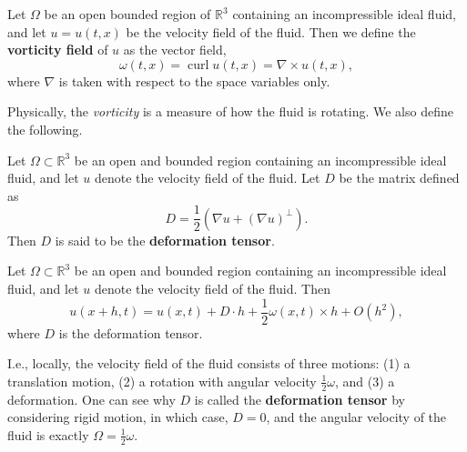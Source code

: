 \documentclass{article}
\begin{document}
\begin{definition}
	Let $\Omega$ be an open bounded region of $\mathbb{R}^{3}$ containing an incompressible ideal fluid, and let $u = u(t, x)$ be the velocity field of the fluid. Then we define the \textbf{vorticity field} of $u$ as the vector field, 
	\begin{equation}
		\omega(t,x) = \operatorname{curl}{u(t,x)} = \nabla \times u(t, x), 
	\end{equation}
	where $\nabla$ is taken with respect to the space variables only.
\end{definition} 
Physically, the \textit{vorticity} is a measure of how the fluid is rotating. We also define the following. 

\begin{definition}
	Let $\Omega \subset \mathbb{R}^{3}$ be an open and bounded region containing an incompressible ideal fluid, and let $u$ denote the velocity field of the fluid. Let $D$ be the matrix defined as 
	\begin{equation*}
		D = \frac{1}{2}(\nabla u + (\nabla u)^{\perp}). 
	\end{equation*}
	Then $D$ is said to be the \textbf{deformation tensor}. 
\end{definition} 
\begin{prop}
	Let $\Omega \subset \mathbb{R}^{3}$ be an open and bounded region containing an incompressible ideal fluid, and let $u$ denote the velocity field of the fluid. Then 
	\begin{equation}
		u(x + h, t) = u(x, t) + D \cdot h + \frac{1}{2}\omega(x, t) \times h + O(h^{2}), 
		\label{eq:local_motion}
	\end{equation}
	where $D$ is the deformation tensor. 
\end{prop} 
I.e., locally, the velocity field of the fluid consists of three motions: (1) a translation motion, (2) a rotation with angular velocity $\frac{1}{2}\omega$, and (3) a deformation. One can see why $D$ is called the \textbf{deformation tensor} by considering rigid motion, in which case, $D = 0$, and the angular velocity of the fluid is exactly $\Omega = \frac{1}{2}\omega$. 
\end{document}
